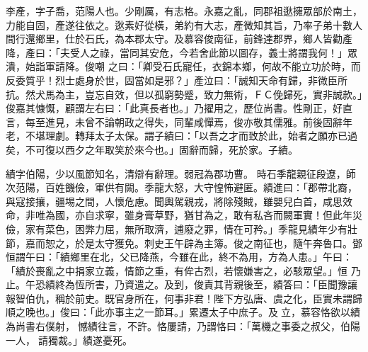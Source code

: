 \begin{pinyinscope}
 李產，字子喬，范陽人也。少剛厲，有志格。永嘉之亂，同郡祖逖擁眾部於南土，力能自固，產遂往依之。逖素好從橫，弟約有大志，產微知其旨，乃率子弟十數人間行還鄉里，仕於石氏，為本郡太守。及慕容俊南征，前鋒達郡界，鄉人皆勸產降，產曰：「夫受人之祿，當同其安危，今若舍此節以圖存，義士將謂我何！」眾潰，始詣軍請降。俊嘲
 之曰：「卿受石氏寵任，衣錦本鄉，何故不能立功於時，而反委質乎！烈士處身於世，固當如是邪？」產泣曰：「誠知天命有歸，非微臣所抗。然犬馬為主，豈忘自效，但以孤窮勢蹙，致力無術，ＦＣ俛歸死，實非誠款。」俊嘉其慷慨，顧謂左右曰：「此真長者也。」乃擢用之，歷位尚書。性剛正，好直言，每至進見，未曾不論朝政之得失，同輩咸憚焉，俊亦敬其儒雅。前後固辭年老，不堪理劇。轉拜太子太保。謂子績曰：「以吾之才而致於此，始者之願亦已過矣，不可復以西夕之年取笑於來今也。」固辭而歸，死於家。子績。



 績字伯陽，少以風節知名，清辯有辭理。弱冠為郡功曹。
 時石季龍親征段遼，師次范陽，百姓饑儉，軍供有闕。季龍大怒，大守惶怖避匿。績進曰：「郡帶北裔，與寇接攘，疆埸之間，人懷危慮。聞輿駕親戎，將除殘賊，雖嬰兒白首，咸思效命，非唯為國，亦自求寧，雖身膏草野，猶甘為之，敢有私吝而闕軍實！但此年災儉，家有菜色，困弊力屈，無所取濟，逋廢之罪，情在可矜。」季龍見績年少有壯節，嘉而恕之，於是太守獲免。刺史王午辟為主簿。俊之南征也，隨午奔魯口。鄧恒謂午曰：「績鄉里在北，父已降燕，今雖在此，終不為用，方為人患。」午曰：「績於喪亂之中捐家立義，情節之重，有侔古烈，若懷嫌害之，必駭眾望。」恒
 乃止。午恐績終為恆所害，乃資遣之。及到，俊責其背親後至，績答曰：「臣聞豫讓報智伯仇，稱於前史。既官身所在，何事非君！陛下方弘唐、虞之化，臣實未謂歸順之晚也。」俊曰：「此亦事主之一節耳。」累遷太子中庶子。及立，慕容恪欲以績為尚書右僕射，憾績往言，不許。恪屢請，乃謂恪曰：「萬機之事委之叔父，伯陽一人，請獨裁。」績遂憂死。



\end{pinyinscope}